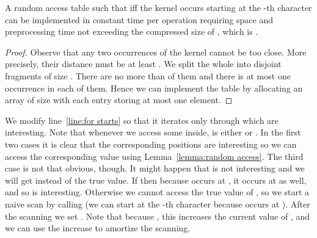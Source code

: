 \documentclass[runningheads]{llncs}
\begin{document}
\begin{lemma}
\label{lemma:random access}
A random access table  such that  iff the kernel occurs starting at the -th character can be implemented in constant time
per operation requiring space and preprocessing time not exceeding the compressed size of , which is .
\end{lemma}

\begin{proof}
Observe that any two occurrences of the kernel cannot be too close. More precisely, their distance must be at least . We split
the whole  into disjoint fragments of size . There are no more than  of them and there is at most one occurrence in
each of them. Hence we can implement the table by allocating an array of size  with each entry storing at most one element.
\end{proof}

We modify line~\ref{line:for starts} so that it iterates only through  which are interesting. Note that whenever we access some  inside,
 is either  or . In the first two cases it is clear that the corresponding positions are interesting so we can access the corresponding
value using Lemma~\ref{lemma:random access}. The third case is not that obvious, though. It might happen that  is not interesting and we will
get  instead of the true value. If  then because  occurs at , it occurs at  as well, and so  is interesting.
Otherwise we cannot access the true value of , so we start a naive scan by calling  (we can start
at the -th character because  occurs at ). After the scanning we set . Note that because , this
increases the current value of , and we can use the increase to amortize the scanning.
\end{document}
